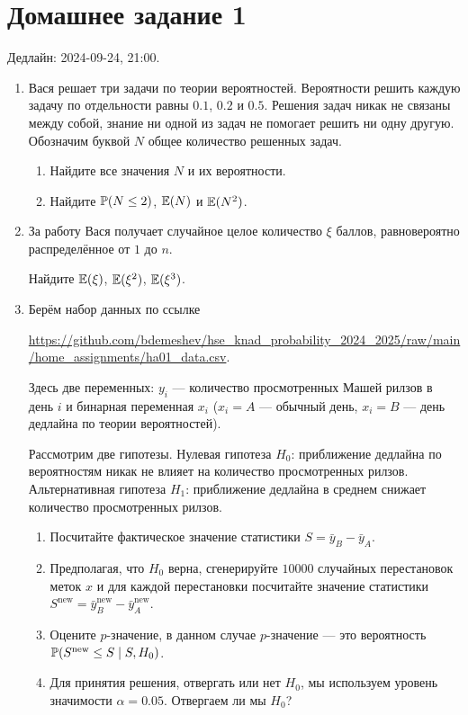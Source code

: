 \section*{Домашнее задание 1}

Дедлайн: 2024-09-24, 21:00.

\begin{enumerate}
\item Вася решает три задачи по теории вероятностей. 
Вероятности решить каждую задачу по отдельности равны $0.1$, $0.2$ и $0.5$. 
Решения задач никак не связаны между собой, знание ни одной из задач не помогает решить ни одну другую.
Обозначим буквой $N$ общее количество решенных задач. 

\begin{enumerate}
    \item Найдите все значения $N$ и их вероятности. 
    \item Найдите $\P(N \leq 2)$, $\E(N)$ и $\E(N^2)$.
\end{enumerate}

\item За работу Вася получает случайное целое количество $\xi$ баллов, равновероятно распределённое от $1$ до $n$. 

Найдите $\E(\xi)$, $\E(\xi^2)$, $\E(\xi^3)$.

\item Берём набор данных по ссылке 

\url{https://github.com/bdemeshev/hse_knad_probability_2024_2025/raw/main/home_assignments/ha01_data.csv}.

Здесь две переменных: $y_i$ — количество просмотренных Машей рилзов в день $i$ 
и бинарная переменная $x_i$ ($x_i = A$ — обычный день, $x_i = B$ — день дедлайна по теории вероятностей).

Рассмотрим две гипотезы. 
Нулевая гипотеза $H_0$: приближение дедлайна по вероятностям никак не влияет на количество просмотренных рилзов.
Альтернативная гипотеза $H_1$: приближение дедлайна в среднем снижает количество просмотренных рилзов. 

\begin{enumerate}
    \item Посчитайте фактическое значение статистики $S = \bar y_B - \bar y_A$.
    \item Предполагая, что $H_0$ верна, сгенерируйте $10000$ случайных перестановок меток $x$ и для 
    каждой перестановки посчитайте значение статистики $S^{\text{new}} = \bar y_B^{\text{new}} - \bar y_A^{\text{new}}$.
    \item Оцените $p$-значение, в данном случае $p$-значение — это вероятность $\P(S^{\text{new}} \leq S \mid S, H_0)$.
    \item Для принятия решения, отвергать или нет $H_0$, мы используем уровень значимости $\alpha = 0.05$.
    Отвергаем ли мы $H_0$?
\end{enumerate}

\end{enumerate}
